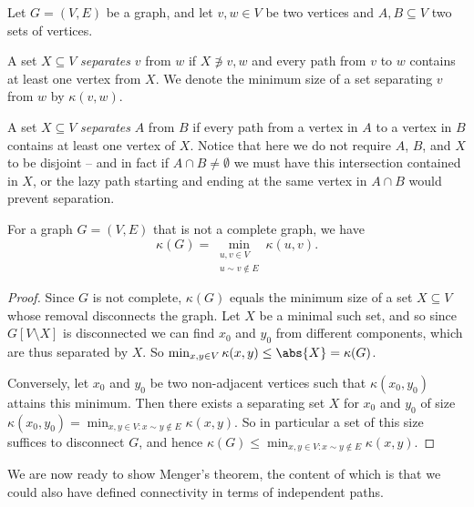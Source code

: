 \documentclass[nobib]{tufte-handout}
\begin{document}
\begin{definition}
  Let $G = (V,E)$ be a graph, and let $v, w \in V$ be two vertices and $A, B \subseteq V$ two sets of vertices.

  A set $X \subseteq V$ \emph{separates} $v$ from $w$ if $X \not\ni v, w$ and every path from $v$ to $w$ contains at least one vertex from $X$. We denote the minimum size of a set separating $v$ from $w$ by $\kappa(v,w)$.

  A set $X \subseteq V$ \emph{separates} $A$ from $B$ if every path from a vertex in $A$ to a vertex in $B$ contains at least one vertex of $X$. Notice that here we do not require $A$, $B$, and $X$ to be disjoint -- and in fact if $A\cap B\neq \emptyset$ we must have this intersection contained in $X$, or the lazy path starting and ending at the same vertex in $A\cap B$ would prevent separation.
\end{definition}

\begin{lemma}\label{lemma:connectivity_is_min_of_pairwise_connectivity}
  For a graph $G = (V,E)$ that is not a complete graph, we have
  $$\kappa(G) = \min_{\substack{u, v \in V\\u\sim v \not\in E}} \kappa(u,v).$$

  \begin{proof}
    Since $G$ is not complete, $\kappa(G)$ equals the minimum size of a set $X \subseteq V$ whose removal disconnects the graph. Let $X$ be a minimal such set, and so since $G[V \setminus X]$ is disconnected we can find $x_0$ and $y_0$ from different components, which are thus separated by $X$. So $\min_{x,y \in V} \kappa(x,y) \leq \abs{X} = \kappa(G)$.

    Conversely, let $x_0$ and $y_0$ be two non-adjacent vertices such that $\kappa(x_0, y_0)$ attains this minimum. Then there exists a separating set $X$ for $x_0$ and $y_0$ of size $\kappa(x_0, y_0) = \min_{x,y \in V: x\sim y \not\in E} \kappa(x, y)$. So in particular a set of this size suffices to disconnect $G$, and hence $\kappa(G) \leq \min_{x,y \in V: x\sim y \not\in E} \kappa(x, y)$.
  \end{proof}
\end{lemma}

We are now ready to show Menger's theorem, the content of which is that we could also have defined connectivity in terms of independent paths.
\end{document}
